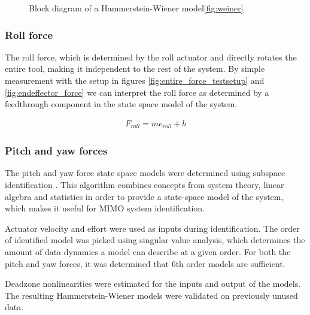 \begin{figure} 
\caption{Block diagram of a Hammerstein-Wiener model\ref{fig:weiner}}
\label{weiner}
\end{figure}

\subsubsection{Roll force}
The roll force, which is determined by the roll actuator and directly rotates the entire tool, making it independent to the rest of the system.
By simple measurement with the setup in figures \ref{fig:entire_force_testsetup} and \ref{fig:endeffector_force} we can interpret the roll force as determined by a feedthrough component in the state space model of the system.

\begin{align}
F_{roll} = m e_{roll} + b
\end{align}

\subsubsection{Pitch and yaw forces}
The pitch and yaw force state space models were determined using subspace identification  \cite{van2012subspace}. This algorithm combines concepts from system theory, linear algebra and statistics in order to provide a state-space model of the system, which makes it useful for MIMO system identification. 

Actuator velocity and effort were used as inputs during identification.
The order of identified model was picked using singular value analysis, which determines the amount of data dynamics a model can describe at a given order. For both the pitch and yaw forces, it was determined that 6th order models are sufficient. 

Deadzone nonlinearities were estimated for the inputs and output of the models. The resulting Hammerstein-Wiener models were validated on previously unused data.

